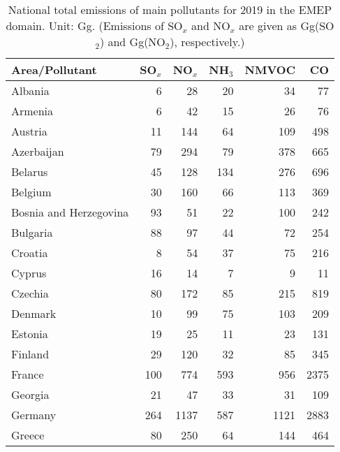 \begin{table}
\caption{National total emissions of main pollutants for 2019 in the EMEP
  domain. Unit: Gg. (Emissions of SO$_x$ and NO$_x$ are given as
  Gg(SO$_2$) and Gg(NO$_2$), respectively.)}
\label{tab:2019emisMAIN}

\vspace{15pt}

\begin{center}
\scriptsize
\begin{tabular}{|l|r|r|r|r|r|}
\hline
 Area/Pollutant&SO$_x$&NO$_x$&NH$_3$&NMVOC&CO\\\hline\hline
                       Albania&     6&    28&    20&    34&    77 \\\hline
                       Armenia&     6&    42&    15&    26&    76 \\\hline
                       Austria&    11&   144&    64&   109&   498 \\\hline
                    Azerbaijan&    79&   294&    79&   378&   665 \\\hline
                       Belarus&    45&   128&   134&   276&   696 \\\hline
                       Belgium&    30&   160&    66&   113&   369 \\\hline
        Bosnia and Herzegovina&    93&    51&    22&   100&   242 \\\hline
                      Bulgaria&    88&    97&    44&    72&   254 \\\hline
                       Croatia&     8&    54&    37&    75&   216 \\\hline
                        Cyprus&    16&    14&     7&     9&    11 \\\hline
                       Czechia&    80&   172&    85&   215&   819 \\\hline
                       Denmark&    10&    99&    75&   103&   209 \\\hline
                       Estonia&    19&    25&    11&    23&   131 \\\hline
                       Finland&    29&   120&    32&    85&   345 \\\hline
                        France&   100&   774&   593&   956&  2375 \\\hline
                       Georgia&    21&    47&    33&    31&   109 \\\hline
                       Germany&   264&  1137&   587&  1121&  2883 \\\hline
                        Greece&    80&   250&    64&   144&   464 \\\hline

\end{tabular}
\end{center}
\end{table}
